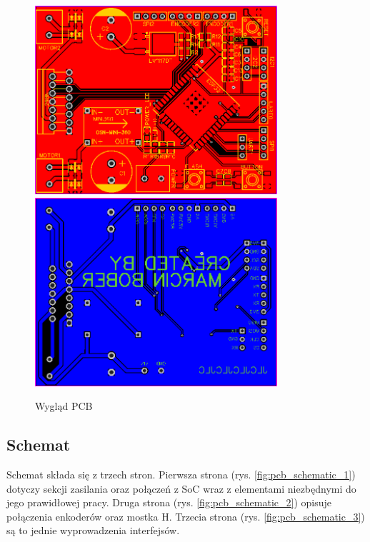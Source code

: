                 \begin{figure}[ht]
                    \centering
                    \includegraphics[width=0.8\textwidth]{img/pcb_front.png}
                    \includegraphics[width=0.8\textwidth]{img/pcb_back.png}
                    \caption{Wygląd PCB}
                    \label{fig:pcb}
                \end{figure}
    
            \subsection{Schemat}
                Schemat składa się z trzech stron. Pierwsza strona (rys. \ref{fig:pcb_schematic_1}) dotyczy sekcji zasilania oraz połączeń z SoC wraz z elementami niezbędnymi do jego prawidłowej pracy. Druga strona (rys. \ref{fig:pcb_schematic_2}) opisuje połączenia enkoderów oraz mostka H. Trzecia strona (rys. \ref{fig:pcb_schematic_3}) są to jednie wyprowadzenia interfejsów.
                  
